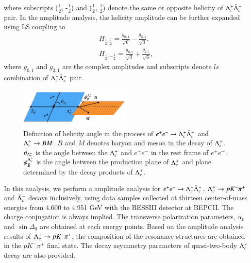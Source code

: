 where subscripts ($\frac{1}{2}$, -$\frac{1}{2}$) and ($\frac{1}{2}$, $\frac{1}{2}$) denote the same or opposite helicity of $\Lambda_{c}^{+}\bar{\Lambda}_{c}^{-}$ pair.
In the amplitude analysis, the helicity amplitude can be further expanded using LS coupling to
\begin{equation}
    \begin{split}
        H_{\frac{1}{2},\frac{1}{2}} = \frac{g_{0,1}}{\sqrt{6}} - \frac{g_{2,1}}{\sqrt{3}}, \\
        H_{\frac{1}{2},-\frac{1}{2}} = \frac{g_{0,1}}{\sqrt{3}} + \frac{g_{2,1}}{\sqrt{6}},
    \end{split}
    \label{eq:eq_helicity}
\end{equation}
where $g_{0,1}$ and $g_{2,1}$ are the complex amplitudes and subscripts denote $ls$ combination of $\Lambda_{c}^{+}\bar{\Lambda}_{c}^{-}$ pair.

\begin{figure}[htbp]
    \centering
    \includegraphics[width=0.50\textwidth]{figure/helicity.png}
    \caption{Definition of helicity angle in the process of $e^+e^- \rightarrow \Lambda_{c}^{+}\bar{\Lambda}_{c}^{-}$ and $\Lambda_{c}^{+} \rightarrow BM$. $B$ and $M$ denotes baryon and meson in the decay of $\Lambda_{c}^{+}$. $\theta_{\Lambda_{c}^{+}}$ is the angle between the $\Lambda_{c}^{+}$ and $e^+e^-$ in the rest frame of $e^+e^-$. $\phi_{B}^{\Lambda_{c}^{+}}$ is the angle between the production plane of $\Lambda_{c}^{+}$ and plane determined by the decay products of $\Lambda_{c}^{+}$.} 
    \label{fig:helicity_ee_lclp}
\end{figure}

In this analysis, we perform a amplitude analysis for $e^+e^- \rightarrow \Lambda_{c}^{+}\bar{\Lambda}_{c}^{-}$, $\Lambda_{c}^{+} \rightarrow p K^- \pi^+$ and $\bar{\Lambda}_{c}^{-}$ decays inclusively, using data samples collected at thirteen center-of-mass energies from 4.600 to 4.951 GeV with the BESSIII detector at BEPCII. The charge conjugation is always implied. The transverse polarization parameters, $\alpha_0$ and $\sin\Delta_0$ are obtained at each energy points. Based on the amplitude analysis results of $\Lambda_{c}^{+} \rightarrow pK^-\pi^+$, the composition of the resonance structures are obtained in the $pK^-\pi^+$ final state. The decay asymmetry parameters of quasi-two-body $\Lambda_{c}^{+}$ decay are also provided.

